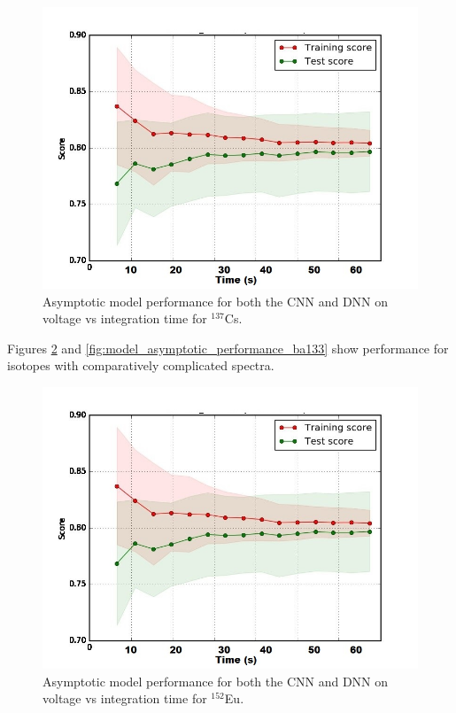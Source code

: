 \begin{figure}[H]
	\centering
	\includegraphics[width=0.75\linewidth]{model_choice_hyperparameter_search_images/asymptotic_performance_time}
	\caption{Asymptotic model performance for both the CNN and DNN on voltage vs integration time for $^{137}$Cs.}
	\label{fig:model_asymptotic_performance_cs137}
\end{figure}

Figures \ref{fig:model_asymptotic_performance_eu152} and \ref{fig:model_asymptotic_performance_ba133} show performance for isotopes with comparatively complicated spectra.

\begin{figure}[H]
	\centering
	\includegraphics[width=0.75\linewidth]{model_choice_hyperparameter_search_images/asymptotic_performance_time}
	\caption{Asymptotic model performance for both the CNN and DNN on voltage vs integration time for $^{152}$Eu.}
	\label{fig:model_asymptotic_performance_eu152}
\end{figure}

